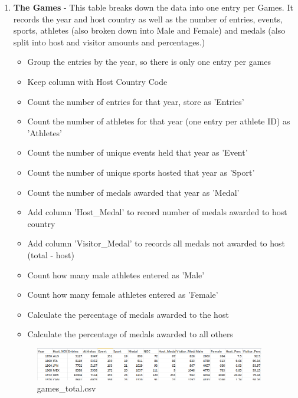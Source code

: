 \documentclass[a4 paper, 12pt]{article}
\begin{document}
\begin{enumerate}
            \item \textbf{The Games} - This table breaks down the data into one entry per Games. It records the year and host country as well as the number of entries, events, sports, athletes (also broken down into Male and Female) and medals (also split into host and visitor amounts and percentages.)
                \begin{itemize}
                    \item Group the entries by the year, so there is only one entry per games
                    \item Keep column with Host Country Code
                    \item Count the number of entries for that year, store as 'Entries'
                    \item Count the number of athletes for that year (one entry per athlete ID) as 'Athletes'
                    \item Count the number of unique events held that year as 'Event'
                    \item Count the number of unique sports hosted that year as 'Sport'
                    \item Count the number of medals awarded that year as 'Medal'
                    \item Add column 'Host\_Medal' to record number of medals awarded to host country
                    \item Add column 'Visitor\_Medal' to records all medals not awarded to host (total - host)
                    \item Count how many male athletes entered as 'Male'
                    \item Count how many female athletes entered as 'Female'
                    \item Calculate the percentage of medals awarded to the host
                    \item Calculate the percentage of medals awarded to all others
                \end{itemize}
                \begin{figure} [H]
                    \centering
                    \includegraphics[width=0.95\textwidth, frame]
                        {./images/data/games_total.png}      
                        \caption{games\_total.csv} 
                \end{figure}


\end{enumerate}
\end{document}
